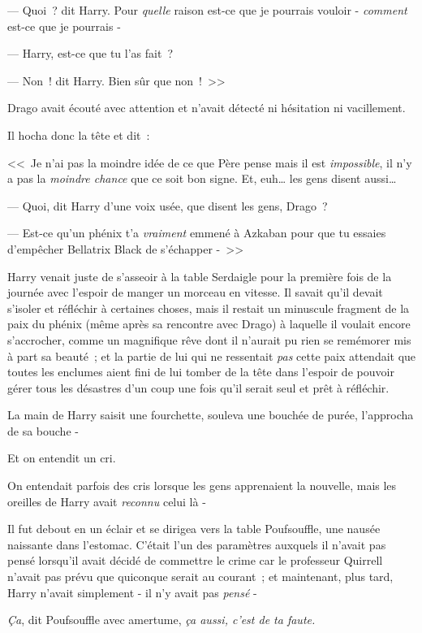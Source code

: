 --- Quoi~? dit Harry. Pour \emph{quelle} raison est-ce que je pourrais vouloir - \emph{comment} est-ce que je pourrais -

--- Harry, est-ce que tu l'as fait~?

--- Non~! dit Harry. Bien sûr que non~!~>>

Drago avait écouté avec attention et n'avait détecté ni hésitation ni vacillement.

Il hocha donc la tête et dit~:

<<~Je n'ai pas la moindre idée de ce que Père pense mais il est \emph{impossible}, il n'y a pas la \emph{moindre chance} que ce soit bon signe. Et, euh… les gens disent aussi…

--- Quoi, dit Harry d'une voix usée, que disent les gens, Drago~?

--- Est-ce qu'un phénix t'a \emph{vraiment} emmené à Azkaban pour que tu essaies d'empêcher Bellatrix Black de s'échapper -~>>


Harry venait juste de s'asseoir à la table Serdaigle pour la première fois de la journée avec l'espoir de manger un morceau en vitesse. Il savait qu'il devait s'isoler et réfléchir à certaines choses, mais il restait un minuscule fragment de la paix du phénix (même après sa rencontre avec Drago) à laquelle il voulait encore s'accrocher, comme un magnifique rêve dont il n'aurait pu rien se remémorer mis à part sa beauté~; et la partie de lui qui ne ressentait \emph{pas} cette paix attendait que toutes les enclumes aient fini de lui tomber de la tête dans l'espoir de pouvoir gérer tous les désastres d'un coup une fois qu'il serait seul et prêt à réfléchir.

La main de Harry saisit une fourchette, souleva une bouchée de purée, l'approcha de sa bouche -

Et on entendit un cri.

On entendait parfois des cris lorsque les gens apprenaient la nouvelle, mais les oreilles de Harry avait \emph{reconnu} celui là -

Il fut debout en un éclair et se dirigea vers la table Poufsouffle, une nausée naissante dans l'estomac. C'était l'un des paramètres auxquels il n'avait pas pensé lorsqu'il avait décidé de commettre le crime car le professeur Quirrell n'avait pas prévu que quiconque serait au courant~; et maintenant, plus tard, Harry n'avait simplement - il n'y avait pas \emph{pensé} -

\emph{Ça}, dit Poufsouffle avec amertume, \emph{ça aussi, c'est de ta faute.}

